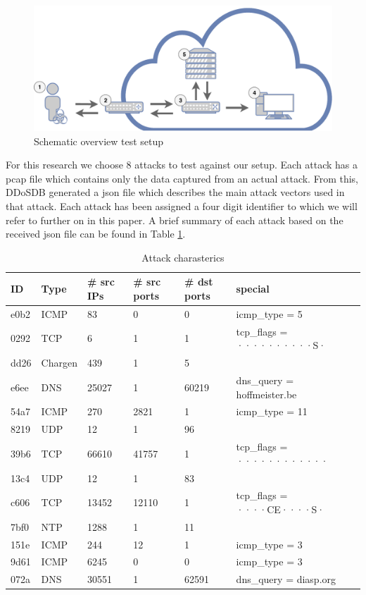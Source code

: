 \begin{figure}[H]
\centering
\includegraphics[width=\textwidth]{./images/test-setup.pdf}
\caption{Schematic overview test setup}
\end{figure}\label{fig:test-setup}

For this research we choose 8 attacks to test against our setup. Each attack has a pcap file which contains only the data captured from an actual attack. From this, DDoSDB generated a json file which describes the main attack vectors used in that attack. Each attack has been assigned a four digit identifier to which we will refer to further on in this paper. A brief summary of each attack based on the received json file can be found in Table \ref{tab:json-summarry}.  


\begin{table}[H]
\centering
\begin{tabular}{l | l | l | l | l | l}
ID & Type & \# src IPs & \# src ports & \# dst ports & special  \\ \hline \hline
e0b2 & ICMP & 83 & 0 & 0 & icmp\_type = 5 \\ \hline
0292 & TCP & 6 & 1 & 1 & tcp\_flags = ··········S· \\ \hline
dd26 & Chargen & 439 & 1 & 5 &  \\ \hline
e6ee & DNS & 25027 & 1 & 60219 & dns\_query = hoffmeister.be \\ \hline
54a7 & ICMP & 270 & 2821 & 1 & icmp\_type = 11 \\ \hline
8219 & UDP & 12 & 1 & 96 &  \\ \hline
39b6 & TCP & 66610 & 41757 & 1 & tcp\_flags = ············ \\ \hline
13c4 & UDP & 12 & 1 & 83 &  \\ \hline
c606 & TCP & 13452 & 12110 & 1 & tcp\_flags = ····CE····S· \\ \hline
7bf0 & NTP & 1288 & 1 & 11 &  \\ \hline
151e & ICMP & 244 & 12 & 1 & icmp\_type = 3 \\ \hline
9d61 & ICMP & 6245 & 0 & 0 & icmp\_type = 3 \\ \hline
072a & DNS & 30551 & 1 & 62591 & dns\_query = diasp.org
\end{tabular}
\caption{\label{tab:json-summarry}Attack charasterics}
\end{table}

